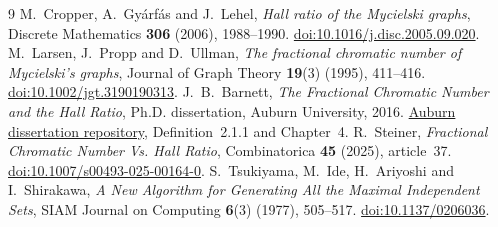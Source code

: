 \documentclass[11pt,letterpaper]{article}
\theoremstyle{remark}
\begin{document}
\begin{thebibliography}{9}
M.~Cropper, A.~Gy\'arf\'as and J.~Lehel,
\emph{Hall ratio of the Mycielski graphs},
Discrete Mathematics \textbf{306} (2006), 1988--1990.
\href{https://doi.org/10.1016/j.disc.2005.09.020}{doi:10.1016/j.disc.2005.09.020}.
M.~Larsen, J.~Propp and D.~Ullman,
\emph{The fractional chromatic number of Mycielski's graphs},
Journal of Graph Theory \textbf{19}(3) (1995), 411--416.
\href{https://doi.org/10.1002/jgt.3190190313}{doi:10.1002/jgt.3190190313}.
J.~B.~Barnett,
\emph{The Fractional Chromatic Number and the Hall Ratio},
Ph.D. dissertation, Auburn University, 2016.
\href{https://etd.auburn.edu/handle/10415/5316}{Auburn dissertation repository},
Definition~2.1.1 and Chapter~4.
R.~Steiner,
\emph{Fractional Chromatic Number Vs. Hall Ratio},
Combinatorica \textbf{45} (2025), article~37.
\href{https://doi.org/10.1007/s00493-025-00164-0}{doi:10.1007/s00493-025-00164-0}.
S.~Tsukiyama, M.~Ide, H.~Ariyoshi and I.~Shirakawa,
\emph{A New Algorithm for Generating All the Maximal Independent Sets},
SIAM Journal on Computing \textbf{6}(3) (1977), 505--517.
\href{https://doi.org/10.1137/0206036}{doi:10.1137/0206036}.
\end{thebibliography}
\end{document}
